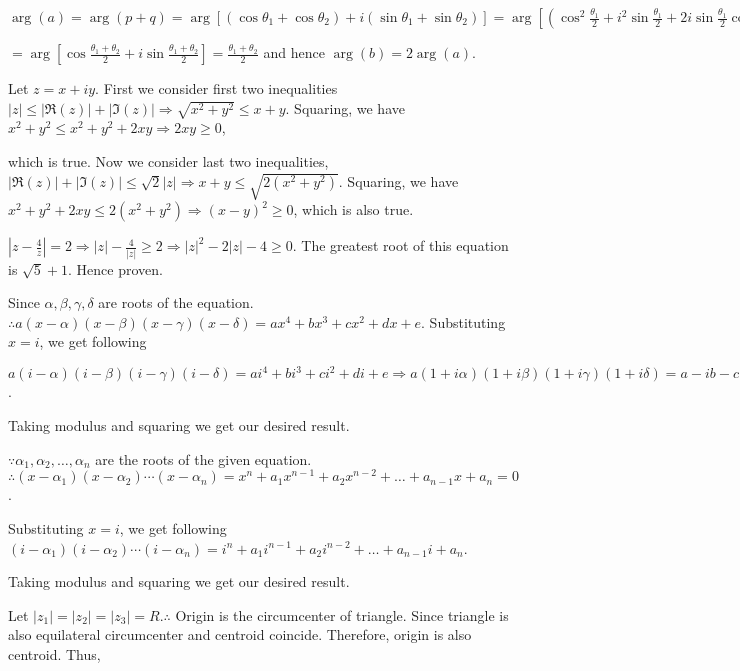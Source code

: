   $\arg(a) = \arg(p + q) = \arg[(\cos\theta_1 + \cos\theta_2) + i(\sin\theta_1 + \sin\theta_2)] =
  \arg\left[\left(\cos^2\frac{\theta_1}{2} + i^2\sin\frac{\theta_1}{2} +
    2i\sin\frac{\theta_1}{2}\cos\frac{\theta_1}{2}\right) + \left(\cos^2\frac{\theta_2}{2} +
    i^2\sin\frac{\theta_2}{2} +2i\sin\frac{\theta_2}{2}\cos\frac{\theta_2}{2}\right)\right]$

  $=\arg\left[\cos\frac{\theta_1 + \theta_2}{2} + i\sin\frac{\theta_1 + \theta_2}{2}\right] = \frac{\theta_1
    + \theta_2}{2}$ and hence $\arg(b) = 2\arg(a)$.
\item Let $z = x + iy$. First we consider first two inequalities $|z| \le |\Re(z)| + |\Im(z)| \Rightarrow
  \sqrt{x^2 + y^2} \le x + y$. Squaring, we have $x^2 + y^2 \le x^2 + y^2 + 2xy \Rightarrow 2xy \ge 0$,

  which is true. Now we consider last two inequalities, $|\Re(z)| + |\Im(z)| \le \sqrt{2}|z|\Rightarrow x + y
  \le \sqrt{2(x^2 + y^2)}$. Squaring, we have $x^2 + y^2 + 2xy \le 2(x^2 + y^2) \Rightarrow (x - y)^2 \ge 0$,
  which is also true.
\item $\left|z - \frac{4}{z}\right| = 2 \Rightarrow |z| - \frac{4}{|z|} \geq 2 \Rightarrow |z|^2 - 2|z| -
  4\geq 0$. The greatest root of this equation is $\sqrt{5} + 1$. Hence proven.
\item Since $\alpha, \beta, \gamma, \delta$ are roots of the equation. $\therefore a(x - \alpha)(x - \beta)(x
  - \gamma)(x - \delta) = ax^4 + bx^3 + cx^2 + dx + e$. Substituting $x = i$, we get following

  $a(i - \alpha)(i - \beta)(i - \gamma)(i - \delta) = ai^4 + bi^3 + ci^2 + di + e \Rightarrow a(1 + i\alpha)(1
  + i\beta)(1 + i\gamma)(1 + i\delta) = a - ib - c + id + e$.

  Taking modulus and squaring we get our desired result.
\item $\because \alpha_1, \alpha_2, \ldots, \alpha_n$ are the roots of the given equation. $\therefore (x -
  \alpha_1)(x - \alpha_2)\cdots(x - \alpha_n) = x^n + a_1x^{n - 1} + a_2x^{n - 2} + \ldots + a_{n- 1}x +
  a_n= 0$.

  Substituting $x = i$, we get following $(i - \alpha_1)(i - \alpha_2)\cdots(i - \alpha_n) = i^n + a_1i^{n -
    1} + a_2i^{n - 2} + \ldots + a_{n- 1}i +a_n$.

  Taking modulus and squaring we get our desired result.
\item Let $|z_1| = |z_2| = |z_3| = R. \therefore$ Origin is the circumcenter of triangle. Since triangle is
  also equilateral circumcenter and centroid coincide. Therefore, origin is also centroid. Thus,

